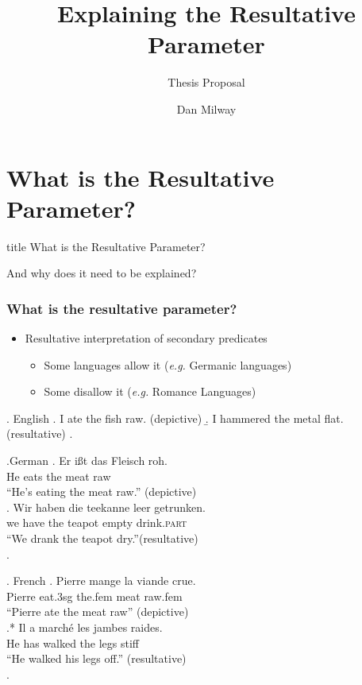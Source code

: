 \documentclass{beamer}
\title{Explaining the Resultative Parameter}
\subtitle{Thesis Proposal}
\author{Dan Milway}
\begin{document}
\section{}
\frame[plain]{\titlepage}
\section{What is the Resultative Parameter?}
\begin{frame}
  \vfill
  \centering
  \begin{beamercolorbox}[sep=8pt,center]{title}
    What is the Resultative Parameter?
  \end{beamercolorbox}
  And why does it need to be explained?
  \vfill
\end{frame}
\begin{frame}
  \frametitle{What is the resultative parameter?}
  \begin{itemize}
    \item Resultative interpretation of secondary predicates
      \begin{itemize}
	\item<1-> Some languages allow it (\textit{e.g.} Germanic languages)
	\item<4-> Some disallow it (\textit{e.g.} Romance Languages)
      \end{itemize}
  \end{itemize}
  \begin{overprint}
    \ex. English
    \a. I ate the fish raw. (depictive)
    \b. I hammered the metal flat. (resultative)
    \z.

    \ex.German 
    \ag. Er i\ss{}t das Fleisch roh.\\
    He eats the meat raw\\
    ``He's eating the meat raw.'' (depictive)\\
    \parencite{muller2004analysis}
    \bg. Wir haben die teekanne leer getrunken.\\
    we have the teapot empty drink.\textsc{part}\\
    ``We drank the teapot dry.''(resultative)\\
    \parencite{kratzer_building_2004}
    \z.

    \ex. French
    \ag. Pierre mange la viande crue.\\
    Pierre eat.3sg the.fem meat raw.fem\\
    ``Pierre ate the meat raw'' (depictive)\\
    \parencite{legendre1997secondary}
    \bg.* Il a march\'e les jambes raides.\\
    He has walked the legs stiff\\
    ``He walked his legs off.'' (resultative)\\
    \parencite{washio1997resultatives}
    \z.


\end{overprint}
\end{frame}
\end{document}
